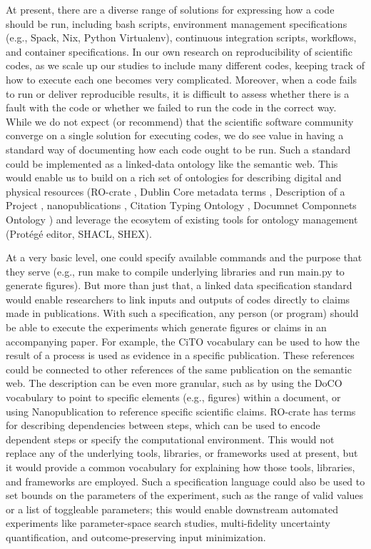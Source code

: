 \documentclass[manuscript,authordraft]{acmart}
\begin{document}
At present, there are a diverse range of solutions for expressing how a
code should be run, including bash scripts, environment management
specifications (e.g., Spack, Nix, Python Virtualenv), continuous
integration scripts, workflows, and container specifications. In our own
research on reproducibility of scientific codes, as we scale up our
studies to include many different codes, keeping track of how to execute
each one becomes very complicated. Moreover, when a code fails to run or
deliver reproducible results, it is difficult to assess whether there is
a fault with the code or whether we failed to run the code in the
correct way. While we do not expect (or recommend) that the scientific
software community converge on a single solution for executing codes, we
do see value in having a standard way of documenting how each code ought
to be run. Such a standard could be implemented as a linked-data
ontology like the semantic web. This would enable us to build on a rich
set of ontologies for describing digital and physical resources
(RO-crate \cite{soiland-reyes_packaging_2022}, Dublin Core metadata
terms \cite{weibel_dublin_2000}, Description of a Project
\cite{wilder-james_description_2017}, nanopublications
\cite{groth_anatomy_2010}, Citation Typing Ontology
\cite{shotton_cito_2010}, Documnet Componnets Ontology
\cite{constantin_document_2016}) and leverage the ecosytem of existing
tools for ontology management (Protégé editor, SHACL, SHEX).

At a very basic level, one could specify available commands and the
purpose that they serve (e.g., run make to compile underlying libraries
and run main.py to generate figures). But more than just that, a linked
data specification standard would enable researchers to link inputs and
outputs of codes directly to claims made in publications. With such a
specification, any person (or program) should be able to execute the
experiments which generate figures or claims in an accompanying paper.
For example, the CiTO vocabulary \cite{shotton_cito_2010} can be used to
how the result of a process is used as evidence in a specific
publication. These references could be connected to other references of
the same publication on the semantic web. The description can be even
more granular, such as by using the DoCO vocabulary
\cite{constantin_document_2016} to point to specific elements (e.g.,
figures) within a document, or using Nanopublication
\cite{groth_anatomy_2010} to reference specific scientific claims.
RO-crate \cite{soiland-reyes_wf4ever_2013} has terms for describing
dependencies between steps, which can be used to encode dependent steps
or specify the computational environment. This would not replace any of
the underlying tools, libraries, or frameworks used at present, but it
would provide a common vocabulary for explaining how those tools,
libraries, and frameworks are employed. Such a specification language
could also be used to set bounds on the parameters of the experiment,
such as the range of valid values or a list of toggleable parameters;
this would enable downstream automated experiments like parameter-space
search studies, multi-fidelity uncertainty quantification, and
outcome-preserving input minimization.
\end{document}
